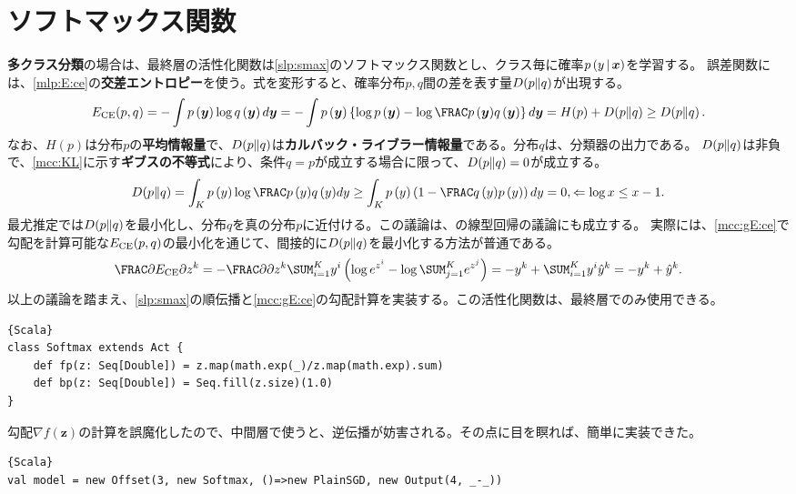\documentclass[10pt,a4paper]{book}
\begin{document}
\section{ソフトマックス関数\label{sect:nn.mcp}}

\textbf{多クラス分類}の場合は、最終層の活性化関数は\eqref{slp:smax}のソフトマックス関数とし、クラス毎に確率$\prob{y}[\bm{x}]$を学習する。
誤差関数には、\eqref{mlp:E:ce}の\textbf{交差エントロピー}を使う。式を変形すると、確率分布$p,q$間の差を表す量$D\!\left(p\|q\right)$が出現する。
%
\begin{equation}
\label{eq:mlp:E:ce}
\Ece(p,q) =
-\int \prob{\bm{y}} \log \qrob{\bm{y}} d\bm{y} =
-\int \prob{\bm{y}} \left\{\log \prob{\bm{y}} - \log\frac{\prob{\bm{y}}}{\qrob{\bm{y}}}\right\} d\bm{y} =
H(p) + \KL{p}{q} \geq
\KL{p}{q}.
\end{equation}
%
なお、$H(p)$は分布$p$の\textbf{平均情報量}で、$D\!\left(p\|q\right)$は\textbf{カルバック・ライブラー情報量}である。分布$q$は、分類器の出力である。
$D\!\left(p\|q\right)$は非負で、\eqref{mcc:KL}に示す\textbf{ギブスの不等式}により、条件$q=p$が成立する場合に限って、$D\!\left(p\|q\right)=0$が成立する。
%
\begin{equation}
\label{eq:mcc:KL}
\KL{p}{q} = \int_K \prob{y} \log \frac{\prob{y}}{\qrob{y}} dy \geq \int_K \prob{y} \tup{1-\frac{\qrob{y}}{\prob{y}}} dy = 0,
\Leftarrow \log x \leq x-1.
\end{equation}
%
最尤推定では$D\!\left(p\|q\right)$を最小化し、分布$q$を真の分布$p$に近付ける。この議論は、の線型回帰の議論にも成立する。
実際には、\eqref{mcc:gE:ce}で勾配を計算可能な$E_\mathrm{CE}(p,q)$の最小化を通じて、間接的に$D\!\left(p\|q\right)$を最小化する方法が普通である。
%
\begin{equation}
\label{eq:mcc:gE:ce}
\pdiff{\Ece}{z^k}
= - \pdiff{}{z^k} \sum_{i=1}^K y^i \tup{\log e^{z^i} - \log \sum_{j=1}^K e^{z^j}}
= - y^k + \sum_{i=1}^K y^i \hat{y}^k = -y^k + \hat{y}^k.
\end{equation}
%
以上の議論を踏まえ、\eqref{slp:smax}の順伝播と\eqref{mcc:gE:ce}の勾配計算を実装する。この活性化関数は、最終層でのみ使用できる。

\begin{Verbatim}{Scala}
class Softmax extends Act {
	def fp(z: Seq[Double]) = z.map(math.exp(_)/z.map(math.exp).sum)
	def bp(z: Seq[Double]) = Seq.fill(z.size)(1.0)
}
\end{Verbatim}

勾配$\nabla f(\bm{z})$の計算を誤魔化したので、中間層で使うと、逆伝播が妨害される。その点に目を瞑れば、簡単に実装できた。

\begin{Verbatim}{Scala}
val model = new Offset(3, new Softmax, ()=>new PlainSGD, new Output(4, _-_))
\end{Verbatim}
\end{document}
